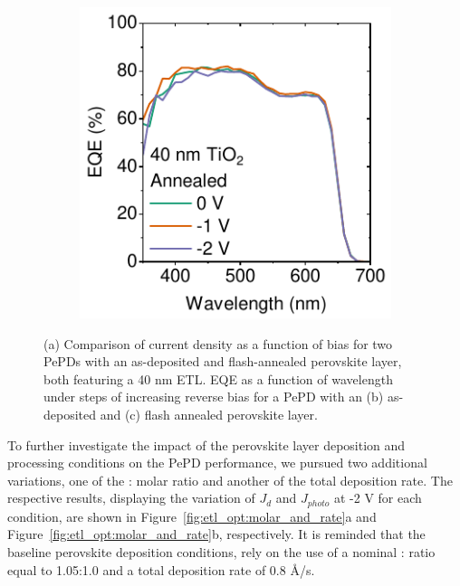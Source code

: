 \begin{figure}[htbp]
\begin{subfigure}[t]{0.32\textwidth}
        \caption{}
        \label{fig:ch2:as_dep_eqe}
    \end{subfigure}
    \hfill
    \begin{subfigure}[t]{0.32\textwidth}
        \centering
        \includegraphics[width=\textwidth]{chapters/material_properties/images/Annealed_EQE.pdf} %
        \caption{}
        \label{fig:ch2:annealed_eqe}
    \end{subfigure}
    \caption{(a) Comparison of current density as a function of bias for two PePDs with an as-deposited and flash-annealed perovskite layer, both featuring a 40 nm  ETL. EQE as a function of wavelength under steps of increasing reverse bias for a PePD with an (b) as-deposited and (c) flash annealed perovskite layer.}
    \label{fig:ETL_opt:annealing_impact}
\end{figure}

To further investigate the impact of the perovskite layer deposition and processing conditions on the PePD performance, we pursued two additional variations, one of the : molar ratio and another of the total deposition rate. The respective results, displaying the variation of $J_d$ and $J_{photo}$ at -2 V for each condition, are shown in Figure~\ref{fig:etl_opt:molar_and_rate}a and Figure~\ref{fig:etl_opt:molar_and_rate}b, respectively. It is reminded that the baseline perovskite deposition conditions, rely on the use of a nominal : ratio equal to 1.05:1.0 and a total deposition rate of 0.8 \AA/s. 

